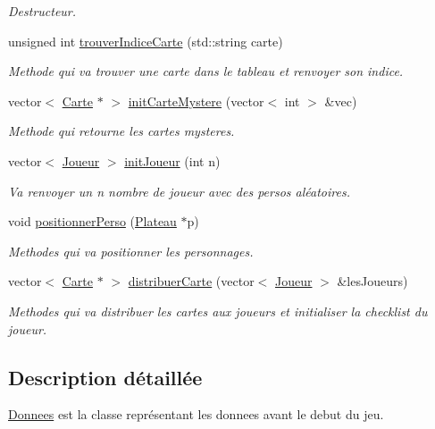 \begin{DoxyCompactItemize}
\begin{DoxyCompactList}\small\item\em \-Destructeur. \end{DoxyCompactList}\item 
unsigned int \hyperlink{classDonnees_a452ba40b985045dbe8d5586514464629}{trouver\-Indice\-Carte} (std\-::string carte)
\begin{DoxyCompactList}\small\item\em \-Methode qui va trouver une carte dans le tableau et renvoyer son indice. \end{DoxyCompactList}\item 
vector$<$ \hyperlink{classCarte}{\-Carte} $\ast$ $>$ \hyperlink{classDonnees_a574a33fb002aa10927bd97c39b84839b}{init\-Carte\-Mystere} (vector$<$ int $>$ \&vec)
\begin{DoxyCompactList}\small\item\em \-Methode qui retourne les cartes mysteres. \end{DoxyCompactList}\item 
vector$<$ \hyperlink{classJoueur}{\-Joueur} $>$ \hyperlink{classDonnees_a85ad060f19a3f27d07699495b8be4fe0}{init\-Joueur} (int n)
\begin{DoxyCompactList}\small\item\em \-Va renvoyer un n nombre de joueur avec des persos aléatoires. \end{DoxyCompactList}\item 
void \hyperlink{classDonnees_a1f7c9ce96432a2cb384d4f1fb22c59f7}{positionner\-Perso} (\hyperlink{classPlateau}{\-Plateau} $\ast$p)
\begin{DoxyCompactList}\small\item\em \-Methodes qui va positionner les personnages. \end{DoxyCompactList}\item 
vector$<$ \hyperlink{classCarte}{\-Carte} $\ast$ $>$ \hyperlink{classDonnees_ae61912de3804ec0a33be8a3168a41b72}{distribuer\-Carte} (vector$<$ \hyperlink{classJoueur}{\-Joueur} $>$ \&les\-Joueurs)
\begin{DoxyCompactList}\small\item\em \-Methodes qui va distribuer les cartes aux joueurs et initialiser la checklist du joueur. \end{DoxyCompactList}\end{DoxyCompactItemize}


\subsection{\-Description détaillée}
\hyperlink{classDonnees}{\-Donnees} est la classe représentant les donnees avant le debut du jeu. 


